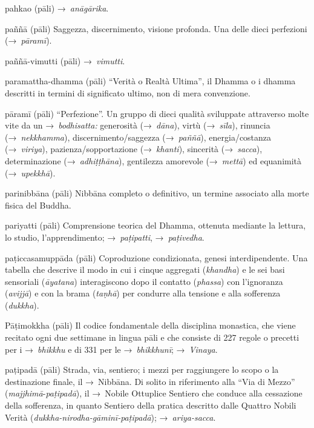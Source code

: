 \begin{glossarydescription}
\item[pahkao] (pāli) →~\emph{anāgārika}.

\item[paññā] (pāli) Saggezza, discernimento, visione profonda. Una delle dieci
  perfezioni (→~\emph{pāramī}).

\item[paññā-vimutti] (pāli) →~\emph{vimutti}.

\item[paramattha-dhamma] (pāli) ``Verità o Realtà Ultima'', il Dhamma o i
  dhamma descritti in termini di significato ultimo, non di mera
  convenzione.

\item[pāramī] (pāli)\label{glossary-parami} ``Perfezione''. Un gruppo di dieci qualità sviluppate
  attraverso molte vite da un →~\emph{bodhisatta:} generosità (→~\emph{dāna}),
  virtù (→~\emph{sīla}), rinuncia (→~\emph{nekkhamma}), discernimento/saggezza
  (→~\emph{paññā}), energia/costanza (→~\emph{viriya}), pazienza/sopportazione
  (→~\emph{khanti}), sincerità (→~\emph{sacca}), determinazione
  (→~\emph{adhiṭṭhāna}), gentilezza amorevole (→~\emph{mettā}) ed equanimità
  (→~\emph{upekkhā}).

\item[parinibbāna] (pāli) Nibbāna completo o definitivo, un termine
  associato alla morte fisica del Buddha.

\item[pariyatti] (pāli) Comprensione teorica del Dhamma, ottenuta mediante la
  lettura, lo studio, l'apprendimento; →~\emph{paṭipatti}, →~\emph{paṭivedha}.

\item[paṭiccasamuppāda] (pāli) Coproduzione condizionata, genesi
  interdipendente. Una tabella che descrive il modo in cui i cinque aggregati
  (\emph{khandha}) e le sei basi sensoriali (\emph{āyatana}) interagiscono dopo
  il contatto (\emph{phassa}) con l'ignoranza (\emph{avijjā}) e con la brama
  (\emph{taṇhā}) per condurre alla tensione e alla sofferenza (\emph{dukkha}).

\item[Pāṭimokkha] (pāli) Il codice fondamentale della disciplina monastica, che
  viene recitato ogni due settimane in lingua pāli e che consiste di 227 regole
  o precetti per i →~\emph{bhikkhu} e di 331 per le →~\emph{bhikkhunī};
  →~\emph{Vinaya}.

\item[paṭipadā] (pāli) Strada, via, sentiero; i mezzi per raggiungere lo scopo o
  la destinazione finale, il →~Nibbāna. Di solito in riferimento alla
  ``Via di Mezzo'' (\emph{majjhimā}-\emph{paṭipadā}), il →~Nobile Ottuplice
  Sentiero che conduce alla cessazione della sofferenza, in quanto Sentiero
  della pratica descritto dalle Quattro Nobili Verità
  (\emph{dukkha-nirodha-gāminī-paṭipadā}); →~\emph{ariya-sacca}.


\end{glossarydescription}
